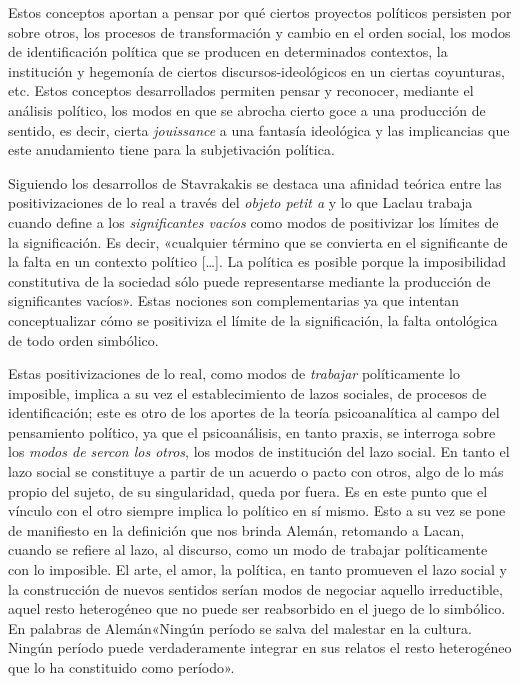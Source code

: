 Estos conceptos aportan a pensar por qué ciertos proyectos políticos persisten por sobre otros, los procesos de transformación y cambio en el orden social, los modos de identificación política que se producen en determinados contextos, la institución y hegemonía de ciertos discursos-ideológicos en un ciertas coyunturas, etc. Estos conceptos desarrollados permiten pensar y reconocer, mediante el análisis político, los modos en que se abrocha cierto goce a una producción de sentido, es decir, cierta \emph{jouissance} a una fantasía ideológica y las implicancias que este anudamiento tiene para la subjetivación política.

Siguiendo los desarrollos de Stavrakakis se destaca una afinidad teórica entre las positivizaciones de lo real a través del \emph{objeto petit a} y lo que Laclau trabaja cuando define a los \emph{significantes vacíos }como modos de positivizar los límites de la significación. Es decir, «cualquier término que se convierta en el significante de la falta en un contexto político {[}\ldots{]}. La política es posible porque la imposibilidad constitutiva de la sociedad sólo puede representarse mediante la producción de significantes vacíos». Estas nociones son complementarias ya que intentan conceptualizar cómo se positiviza el límite de la significación, la falta ontológica de todo orden simbólico.

Estas positivizaciones de lo real, como modos de \emph{trabajar} políticamente lo imposible, implica a su vez el establecimiento de lazos sociales, de procesos de identificación; este es otro de los aportes de la teoría psicoanalítica al campo del pensamiento político, ya que el psicoanálisis, en tanto praxis, se interroga sobre los \emph{modos de sercon los otros}, los modos de institución del lazo social. En tanto el lazo social se constituye a partir de un acuerdo o pacto con otros, algo de lo más propio del sujeto, de su singularidad, queda por fuera. Es en este punto que el vínculo con el otro siempre implica lo político en sí mismo. Esto a su vez se pone de manifiesto en la definición que nos brinda Alemán, retomando a Lacan, cuando se refiere al lazo, al discurso, como un modo de trabajar políticamente con lo imposible. El arte, el amor, la política, en tanto promueven el lazo social y la construcción de nuevos sentidos serían modos de negociar aquello irreductible, aquel resto heterogéneo que no puede ser reabsorbido en el juego de lo simbólico. En palabras de Alemán«Ningún período se salva del malestar en la cultura. Ningún período puede verdaderamente integrar en sus relatos el resto heterogéneo que lo ha constituido como período».

